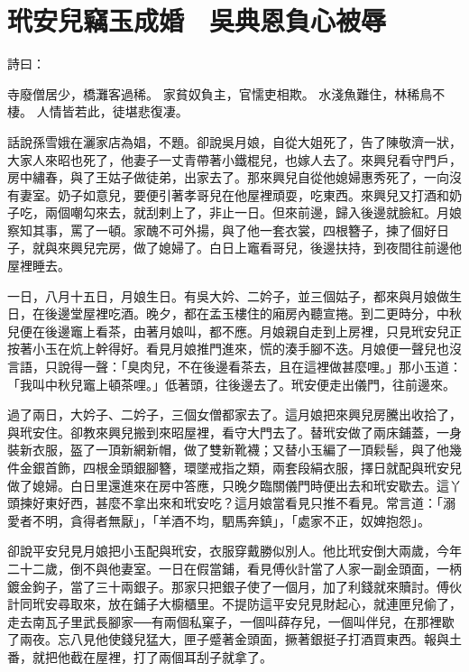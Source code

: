 %

\chapter{玳安兒竊玉成婚　吳典恩負心被辱}

詩曰：

寺廢僧居少，橋灘客過稀。
家貧奴負主，官懦吏相欺。
水淺魚難住，林稀鳥不棲。
人情皆若此，徒堪悲復凄。

話說孫雪娥在灑家店為娼，不題。卻說吳月娘，自從大姐死了，告了陳敬濟一狀，大家人來昭也死了，他妻子一丈青帶著小鐵棍兒，也嫁人去了。來興兒看守門戶，房中繡春，與了王姑子做徒弟，出家去了。那來興兒自從他媳婦惠秀死了，一向沒有妻室。奶子如意兒，要便引著孝哥兒在他屋裡頑耍，吃東西。來興兒又打酒和奶子吃，兩個嘲勾來去，就刮剌上了，非止一日。但來前邊，歸入後邊就臉紅。月娘察知其事，罵了一頓。家醜不可外揚，與了他一套衣裳，四根簪子，揀了個好日子，就與來興兒完房，做了媳婦了。白日上竈看哥兒，後邊扶持，到夜間往前邊他屋裡睡去。

一日，八月十五日，月娘生日。有吳大妗、二妗子，並三個姑子，都來與月娘做生日，在後邊堂屋裡吃酒。晚夕，都在孟玉樓住的廂房內聽宣捲。到二更時分，中秋兒便在後邊竈上看茶，由著月娘叫，都不應。月娘親自走到上房裡，只見玳安兒正按著小玉在炕上幹得好。看見月娘推門進來，慌的湊手腳不迭。月娘便一聲兒也沒言語，只說得一聲：「臭肉兒，不在後邊看茶去，且在這裡做甚麼哩。」那小玉道：「我叫中秋兒竈上頓茶哩。」低著頭，往後邊去了。玳安便走出儀門，往前邊來。

過了兩日，大妗子、二妗子，三個女僧都家去了。這月娘把來興兒房騰出收拾了，與玳安住。卻教來興兒搬到來昭屋裡，看守大門去了。替玳安做了兩床鋪蓋，一身裝新衣服，盔了一頂新網新帽，做了雙新靴襪；又替小玉編了一頂鬏髻，與了他幾件金銀首飾，四根金頭銀腳簪，環墜戒指之類，兩套段絹衣服，擇日就配與玳安兒做了媳婦。白日里還進來在房中答應，只晚夕臨關儀門時便出去和玳安歇去。這丫頭揀好東好西，甚麼不拿出來和玳安吃？這月娘當看見只推不看見。常言道：「溺愛者不明，貪得者無厭」，「羊酒不均，駟馬奔鎮」，「處家不正，奴婢抱怨」。

卻說平安兒見月娘把小玉配與玳安，衣服穿戴勝似別人。他比玳安倒大兩歲，今年二十二歲，倒不與他妻室。一日在假當鋪，看見傅伙計當了人家一副金頭面，一柄鍍金鉤子，當了三十兩銀子。那家只把銀子使了一個月，加了利錢就來贖討。傅伙計同玳安尋取來，放在鋪子大櫥櫃里。不提防這平安兒見財起心，就連匣兒偷了，走去南瓦子里武長腳家──有兩個私窠子，一個叫薛存兒，一個叫伴兒，在那裡歇了兩夜。忘八見他使錢兒猛大，匣子蹙著金頭面，撅著銀挺子打酒買東西。報與土番，就把他截在屋裡，打了兩個耳刮子就拿了。

